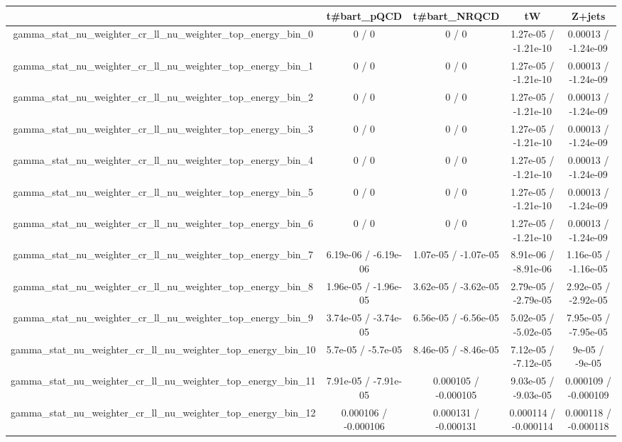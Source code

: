 \documentclass[10pt]{article}
\begin{document}
\begin{table}[htbp]
\begin{center}
\begin{tabular}{|c|c|c|c|c|}
\hline 
      & t#bar{t}_{pQCD}      & t#bar{t}_{NRQCD}      & tW      & Z+jets \\ 
\hline 
  gamma_stat_nu_weighter_cr_ll_nu_weighter_top_energy_bin_0 & 0 / 0 & 0 / 0 & 1.27e-05 / -1.21e-10 & 0.00013 / -1.24e-09 \\ 
  gamma_stat_nu_weighter_cr_ll_nu_weighter_top_energy_bin_1 & 0 / 0 & 0 / 0 & 1.27e-05 / -1.21e-10 & 0.00013 / -1.24e-09 \\ 
  gamma_stat_nu_weighter_cr_ll_nu_weighter_top_energy_bin_2 & 0 / 0 & 0 / 0 & 1.27e-05 / -1.21e-10 & 0.00013 / -1.24e-09 \\ 
  gamma_stat_nu_weighter_cr_ll_nu_weighter_top_energy_bin_3 & 0 / 0 & 0 / 0 & 1.27e-05 / -1.21e-10 & 0.00013 / -1.24e-09 \\ 
  gamma_stat_nu_weighter_cr_ll_nu_weighter_top_energy_bin_4 & 0 / 0 & 0 / 0 & 1.27e-05 / -1.21e-10 & 0.00013 / -1.24e-09 \\ 
  gamma_stat_nu_weighter_cr_ll_nu_weighter_top_energy_bin_5 & 0 / 0 & 0 / 0 & 1.27e-05 / -1.21e-10 & 0.00013 / -1.24e-09 \\ 
  gamma_stat_nu_weighter_cr_ll_nu_weighter_top_energy_bin_6 & 0 / 0 & 0 / 0 & 1.27e-05 / -1.21e-10 & 0.00013 / -1.24e-09 \\ 
  gamma_stat_nu_weighter_cr_ll_nu_weighter_top_energy_bin_7 & 6.19e-06 / -6.19e-06 & 1.07e-05 / -1.07e-05 & 8.91e-06 / -8.91e-06 & 1.16e-05 / -1.16e-05 \\ 
  gamma_stat_nu_weighter_cr_ll_nu_weighter_top_energy_bin_8 & 1.96e-05 / -1.96e-05 & 3.62e-05 / -3.62e-05 & 2.79e-05 / -2.79e-05 & 2.92e-05 / -2.92e-05 \\ 
  gamma_stat_nu_weighter_cr_ll_nu_weighter_top_energy_bin_9 & 3.74e-05 / -3.74e-05 & 6.56e-05 / -6.56e-05 & 5.02e-05 / -5.02e-05 & 7.95e-05 / -7.95e-05 \\ 
  gamma_stat_nu_weighter_cr_ll_nu_weighter_top_energy_bin_10 & 5.7e-05 / -5.7e-05 & 8.46e-05 / -8.46e-05 & 7.12e-05 / -7.12e-05 & 9e-05 / -9e-05 \\ 
  gamma_stat_nu_weighter_cr_ll_nu_weighter_top_energy_bin_11 & 7.91e-05 / -7.91e-05 & 0.000105 / -0.000105 & 9.03e-05 / -9.03e-05 & 0.000109 / -0.000109 \\ 
  gamma_stat_nu_weighter_cr_ll_nu_weighter_top_energy_bin_12 & 0.000106 / -0.000106 & 0.000131 / -0.000131 & 0.000114 / -0.000114 & 0.000118 / -0.000118 \\ 

\end{tabular}
\end{center}
\end{table}
\end{document}
